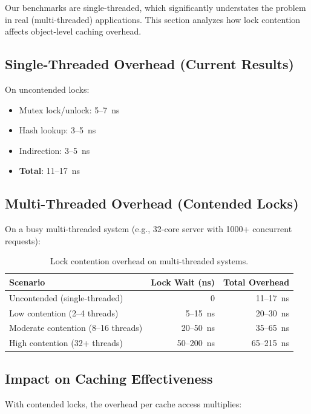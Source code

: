 \documentclass[sigplan,final]{acmart}
\begin{document}
Our benchmarks are single-threaded, which significantly understates the problem in real (multi-threaded) applications. This section analyzes how lock contention affects object-level caching overhead.

\subsection{Single-Threaded Overhead (Current Results)}

On uncontended locks:
\begin{itemize}
  \item Mutex lock/unlock: 5--7~ns
  \item Hash lookup: 3--5~ns
  \item Indirection: 3--5~ns
  \item \textbf{Total}: 11--17~ns
\end{itemize}

\subsection{Multi-Threaded Overhead (Contended Locks)}

On a busy multi-threaded system (e.g., 32-core server with 1000+ concurrent requests):

\begin{table}[h]
\centering
\caption{Lock contention overhead on multi-threaded systems.}
\label{tab:threading-overhead}
\begin{tabular}{@{}lrr@{}}
\toprule
\textbf{Scenario} & \textbf{Lock Wait (ns)} & \textbf{Total Overhead} \\
\midrule
Uncontended (single-threaded) & 0 & 11--17~ns \\
Low contention (2--4 threads) & 5--15~ns & 20--30~ns \\
Moderate contention (8--16 threads) & 20--50~ns & 35--65~ns \\
High contention (32+ threads) & 50--200~ns & 65--215~ns \\
\bottomrule
\end{tabular}
\end{table}

\subsection{Impact on Caching Effectiveness}

With contended locks, the overhead per cache access multiplies:
\end{document}
